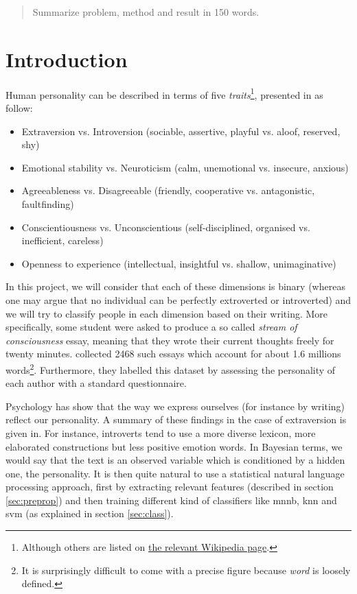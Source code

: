 \begin{abstract}
	Summarize problem, method and result in 150 words.
\end{abstract}
\newpage

\section{Introduction}
Human personality can be described in terms of five \emph{traits}\footnote{Although others are listed on
\href{http://en.wikipedia.org/wiki/Trait\_theory\#List\_of\_personality\_traits}{the
relevant Wikipedia page}.}, presented in \autocite{mairesse2007perso} as follow:
\begin{itemize}
\item Extraversion vs. Introversion (sociable, assertive, playful vs. aloof, reserved, shy)
\item Emotional stability vs. Neuroticism (calm, unemotional vs. insecure, anxious)
\item Agreeableness vs. Disagreeable (friendly, cooperative vs. antagonistic, faultfinding)
\item Conscientiousness vs. Unconscientious (self-disciplined, organised vs. inefficient, careless)
\item Openness to experience (intellectual, insightful vs. shallow, unimaginative)
\end{itemize}

In this project, we will consider that each of these dimensions is binary (whereas one may argue that no individual can be perfectly extroverted or introverted) and we will try to classify people in each dimension based on their writing. More specifically, some student were asked to produce a so called \emph{stream of consciousness} essay, meaning that they wrote their current thoughts freely for twenty minutes. \Textcite{pennebaker1999corpus} collected 2468 such essays which account for about 1.6 millions words\footnote{It is surprisingly difficult to come with a precise figure because \emph{word} is loosely defined.}. Furthermore, they labelled this dataset by assessing the personality of each author with a standard questionnaire.

Psychology has show that the way we express ourselves (for instance by writing) reflect our personality. A summary of these findings in the case of extraversion is given in\autocite[][Table 1]{mairesse2007perso}. For instance, introverts tend to use a more diverse lexicon, more elaborated constructions but less positive emotion words. In Bayesian terms, we would say that the text is an observed variable which is conditioned by a hidden one, the personality. It is then quite natural to use a statistical natural language processing approach, first by extracting relevant features (described in section \vref{sec:preprop}) and then training different kind of classifiers like \gls{mnnb}, \gls{knn} and \gls{svm} (as explained in section \vref{sec:class}).

